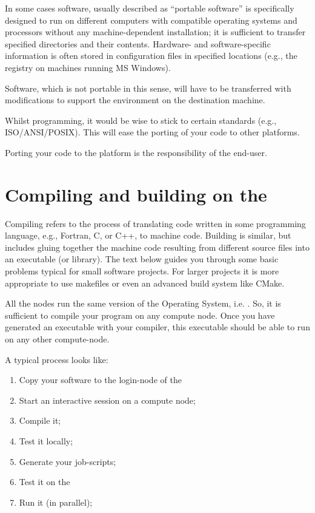 In some cases software, usually described as ``portable software'' is
specifically designed to run on different computers with compatible operating
systems and processors without any machine-dependent installation; it is
sufficient to transfer specified directories and their contents. Hardware- and
software-specific information is often stored in configuration files in
specified locations (e.g., the registry on machines running MS Windows).

Software, which is not portable in this sense, will have to be transferred with
modifications to support the environment on the destination machine.

Whilst programming, it would be wise to stick to certain standards (e.g.,
ISO/ANSI/POSIX).  This will ease the porting of your code to other platforms.

Porting your code to the \operatingsystem platform is the responsibility of the
end-user.

\section{Compiling and building on the \hpc}

Compiling refers to the process of translating code written in some programming
language, e.g., Fortran, C, or C++, to machine code. Building is similar, but
includes gluing together the machine code resulting from different source files
into an executable (or library). The text below guides you through some basic
problems typical for small software projects. For larger projects it is more
appropriate to use makefiles or even an advanced build system like CMake.

All the \hpc nodes run the same version of the Operating System, i.e.
\operatingsystem. So, it is sufficient to compile your program on any compute
node.  Once you have generated an executable with your compiler, this
executable should be able to run on any other compute-node.

A typical process looks like:

\begin{enumerate}
\item  Copy your software to the login-node of the \hpc
\item  Start an interactive session on a compute node;
\item  Compile it;
\item  Test it locally;
\item  Generate your job-scripts;
\item  Test it on the \hpc
\item  Run it (in parallel);
\end{enumerate}

